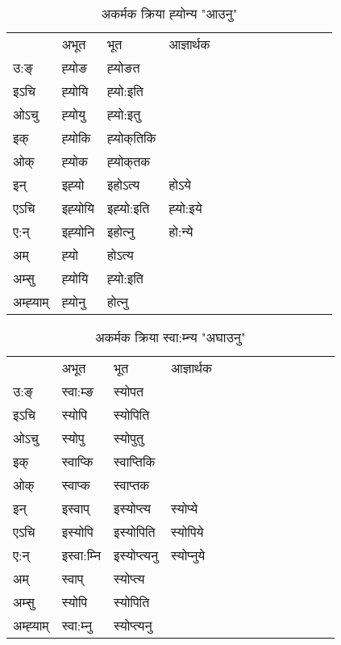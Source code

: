 \begin{table}[H]
\centering
\caption{\label{o.vi} अकर्मक क्रिया  ह्‍योन्य  "आउनु"  }
\begin{tabular}{l|l|l|l|l|l|l|l|l|l|l|l|l}  \toprule
&अभूत & भूत & आज्ञार्थक \\ 
उ:ङ्‌ &ह्‍योङ &ह्‍योङत \\ 
इऽचि &ह्‍योयि &ह्‍यो:इति   \\ 
ओऽचु &ह्‍योयु &ह्‍यो:इतु   \\ 
इक् &ह्‍योकि &ह्‍योक्‌तिकि   \\ 
ओक् &ह्‍योक &ह्‍योक्‌तक   \\ 
इन् & इह्‍यो & इहोऽत्य &होऽये  \\ 
एऽचि & इह्‍योयि & इह्‍यो:इति &ह्‍यो:इये    \\ 
ए:न् & इह्‍योनि  & इहोत्‍नु &हो:न्ये  \\ 
अम् & ह्‍यो & होऽत्य   \\ 
अम्सु & ह्‍योयि & ह्‍यो:इति     \\ 
अम्ह्‍याम् & ह्‍योनु  & होत्‍नु \\ 
\bottomrule
\end{tabular}
\end{table}


\begin{table}[H]
\centering
\caption{\label{op.vi} अकर्मक क्रिया  स्वा:म्‍न्य  "अघाउनु"  }
\begin{tabular}{l|l|l|l|l|l|l|l|l|l|l|l|l}  \toprule
&अभूत & भूत & आज्ञार्थक \\ 
उ:ङ्‌ &स्वा:म्ङ &स्योपत \\ 
इऽचि &स्योपि &स्योपिति   \\ 
ओऽचु &स्योपु &स्योपुतु   \\ 
इक् &स्वाप्कि &स्वाप्‍तिकि   \\ 
ओक् &स्वाप्क &स्वाप्‍तक   \\ 
इन् & इस्वाप् & इस्योप्‍त्य &स्योप्ये  \\ 
एऽचि & इस्योपि & इस्योपिति &स्योपिये    \\ 
ए:न् & इस्वा:म्‍नि  & इस्योप्‍त्यनु &स्योप्‍नुये  \\ 
अम् & स्वाप् & स्योप्‍त्य   \\ 
अम्सु & स्योपि & स्योपिति   \\ 
अम्ह्‍याम् & स्वा:म्‍नु  & स्योप्‍त्यनु \\ 
\bottomrule
\end{tabular}
\end{table}


